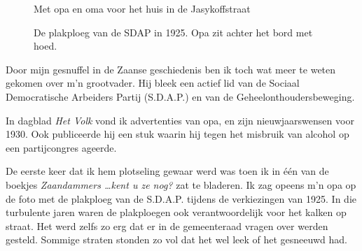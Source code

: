 \documentclass[12pt,twoside, openright]{memoir}
\begin{document}
\begin{figure}
\caption*{\footnotesize Met opa en oma voor het huis in de Jasykoffstraat}
\end{figure}

\begin{figure}
\caption*{\footnotesize De plakploeg van de SDAP in 1925. Opa zit achter het bord met hoed.}
\end{figure}

Door mijn gesnuffel in de Zaanse geschiedenis ben ik toch wat meer te weten gekomen over m’n grootvader. Hij bleek een actief lid van de Sociaal Democratische Arbeiders Partij (S.D.A.P.) en van de Geheelonthoudersbeweging.  

In dagblad \emph{Het Volk} vond ik advertenties van opa, en zijn nieuwjaarswensen voor 1930. Ook publiceerde hij een stuk waarin hij tegen het misbruik van alcohol op een partijcongres ageerde.

De eerste keer dat ik hem plotseling gewaar werd was toen ik in één van de boekjes \emph{Zaandammers \ldots kent u ze nog?} zat te bladeren. Ik zag opeens m’n opa op de foto met de plakploeg van de S.D.A.P. tijdens de verkiezingen van 1925. In die turbulente jaren waren de plakploegen ook verantwoordelijk voor het kalken op straat. Het werd zelfs zo erg dat er in de gemeenteraad vragen over werden gesteld. Sommige straten stonden zo vol dat het wel leek of het gesneeuwd had.
\end{document}
